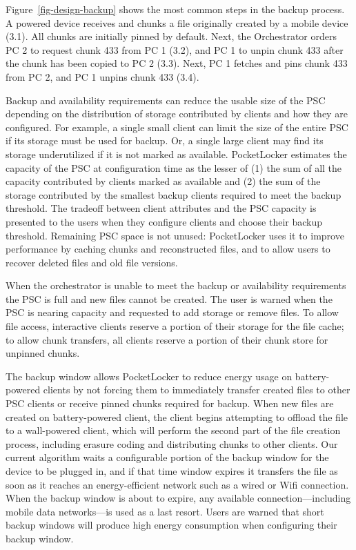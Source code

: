 Figure~\ref{fig-design-backup} shows the most common steps in the backup
process.  A powered device receives and chunks a file originally created by a
mobile device (3.1).  All chunks are initially pinned by default.  Next, the
Orchestrator orders PC 2 to request chunk 433 from PC 1 (3.2), and PC 1 to
unpin chunk 433 after the chunk has been copied to PC 2 (3.3).  Next, PC 1
fetches and pins chunk 433 from PC 2, and PC 1 unpins chunk 433 (3.4). 

Backup and availability requirements can reduce the usable size of the PSC
depending on the distribution of storage contributed by clients and how they
are configured. For example, a single small client can limit the size of the
entire PSC if its storage must be used for backup. Or, a single large client
may find its storage underutilized if it is not marked as available.
PocketLocker estimates the capacity of the PSC at configuration time as the
lesser of (1) the sum of all the capacity contributed by clients marked as
available and (2) the sum of the storage contributed by the smallest backup
clients required to meet the backup threshold. The tradeoff between client
attributes and the PSC capacity is presented to the users when they configure
clients and choose their backup threshold. Remaining PSC space is not unused:
PocketLocker uses it to improve performance by caching chunks and
reconstructed files, and to allow users to recover deleted files and old file
versions.

When the orchestrator is unable to meet the backup or availability
requirements the PSC is full and new files cannot be created. The user is
warned when the PSC is nearing capacity and requested to add storage or
remove files. To allow file access, interactive clients reserve a portion of
their storage for the file cache; to allow chunk transfers, all clients
reserve a portion of their chunk store for unpinned chunks.

The backup window allows PocketLocker to reduce energy usage on
battery-powered clients by not forcing them to immediately transfer created
files to other PSC clients or receive pinned chunks required for backup. When
new files are created on battery-powered client, the client begins attempting
to offload the file to a wall-powered client, which will perform the second
part of the file creation process, including erasure coding and distributing
chunks to other clients. Our current algorithm waits a configurable portion
of the backup window for the device to be plugged in, and if that time window
expires it transfers the file as soon as it reaches an energy-efficient
network such as a wired or Wifi connection. When the backup window is about
to expire, any available connection---including mobile data networks---is used
as a last resort. Users are warned that short backup windows will produce
high energy consumption when configuring their backup window.

